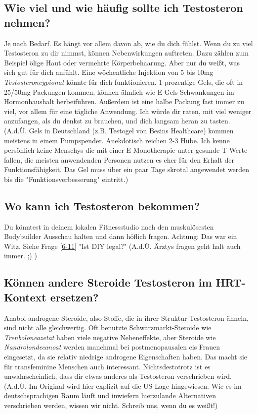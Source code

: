 \documentclass{article}
\begin{document}
\subsection{Wie viel und wie häufig sollte ich Testosteron nehmen?}

Je nach Bedarf. Es hängt vor allem davon ab, wie du dich fühlst. Wenn du zu viel Testosteron zu dir nimmst, können Nebenwirkungen auftreten. Dazu zählen zum Beispiel ölige Haut oder vermehrte Körperbehaarung. Aber nur du weißt, was sich gut für dich anfühlt. Eine wöchentliche Injektion von 5 bis 10mg \textit{Testosteroncypionat} könnte für dich funktionieren.  1-prozentige Gels, die oft in 25/50mg Packungen kommen, können ähnlich wie E-Gels Schwankungen im Hormonhaushalt herbeiführen. Außerdem ist eine halbe Packung fast immer zu viel, vor allem für eine tägliche Anwendung. Ich würde dir raten, mit viel weniger anzufangen, als du denkst zu brauchen, und dich langsam heran zu tasten. (A.d.Ü. Gels in Deutschland (z.B. Testogel von Besins Healthcare) kommen meistens in einem Pumpspender. Anekdotisch reichen 2-3 Hübe. Ich kenne persönlich keine Menschys die mit einer E-Monotherapie unter gesunde T-Werte fallen, die meisten anwendenden Personen nutzen es eher für den Erhalt der Funktionsfähigkeit. Das Gel muss über ein paar Tage skrotal angewendet werden bis die "Funktionsverbesserung" eintritt.)

\subsection{Wo kann ich Testosteron bekommen?}

Du könntest in deinem lokalen Fitnessstudio nach den muskulösesten Bodybuilder Ausschau halten und dann höflich fragen. Achtung: Das war ein Witz. Siehe Frage \ref{6-11} "Ist DIY legal?" (A.d.Ü. Ärztys fragen geht halt auch immer. ;) )

\subsection{Können andere Steroide Testosteron im HRT-Kontext ersetzen?}

Anabol-androgene Steroide, also Stoffe, die in ihrer Struktur Testosteron ähneln, sind nicht alle gleichwertig. Oft benutzte Schwarzmarkt-Steroide wie \textit{Trenboloneazetat} haben viele negative Nebeneffekte, aber Steroide wie \textit{Nandrolondecanoat }werden manchmal bei postmenopausalen cis Frauen eingesetzt, da sie relativ niedrige androgene Eigenschaften haben. Das macht sie für transfeminine Menschen auch interessant. Nichtsdestotrotz ist es unwahrscheinlich, dass dir etwas anderes als Testosteron verschrieben wird. (A.d.Ü. Im Original wird hier explizit auf die US-Lage hingewiesen. Wie es im deutschsprachigen Raum läuft und inwiefern hierzulande Alternativen verschrieben werden, wissen wir nicht. Schreib uns, wenn du es weißt!)
\end{document}
